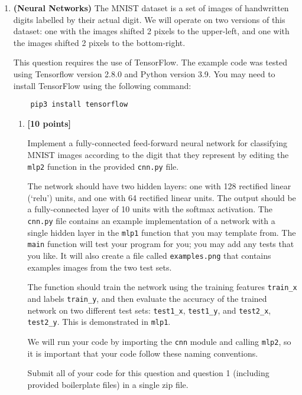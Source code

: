 \documentclass{article}
\newcounter{totalpoints}
\newcommand{\points}[1]{{\addtocounter{totalpoints}{#1}\textbf{[#1 points]}}}
\begin{document}
\pagestyle{myheadings}

\begin{enumerate}

\item \textbf{(Neural Networks)}
The MNIST dataset is a set of images of handwritten digits labelled by their actual digit.
We will operate on two versions of this dataset: one with the images shifted 2 pixels to the upper-left, and one with the images shifted 2 pixels to the bottom-right.

This question requires the use of TensorFlow.
The example code was tested using Tensorflow version 2.8.0 and Python version 3.9.
You may need to install TensorFlow using the following command:
\begin{verbatim}
    pip3 install tensorflow
\end{verbatim}



\begin{enumerate}
\item\points{10}
Implement a fully-connected feed-forward neural network for classifying MNIST images according to the digit that they represent by editing the \verb|mlp2| function in the provided \texttt{cnn.py} file.

The network should have two hidden layers: one with 128 rectified linear (`relu') units, and one with 64 rectified linear units.  The output should be a fully-connected layer of 10 units with the softmax activation.  The \texttt{cnn.py} file contains an example implementation of a network with a single hidden layer in the \verb|mlp1| function that you may template from.  The \verb|main| function will test your program for you; you may add any tests that you like.
It will also create a file called \texttt{examples.png} that contains examples images from the two test sets.

The function should train the network using the training features \verb|train_x| and labels \verb|train_y|, and then evaluate the accuracy of the trained network on two different test sets: \verb|test1_x|, \verb|test1_y|, and \verb|test2_x|, \verb|test2_y|.
This is demonstrated in \verb|mlp1|.

We will run your code by importing the \verb|cnn| module and calling \verb|mlp2|, so it is important that your code follow these naming conventions.

Submit all of your code for this question and question 1 (including provided boilerplate files) in a single zip file.


\end{enumerate}
\end{enumerate}
\end{document}
